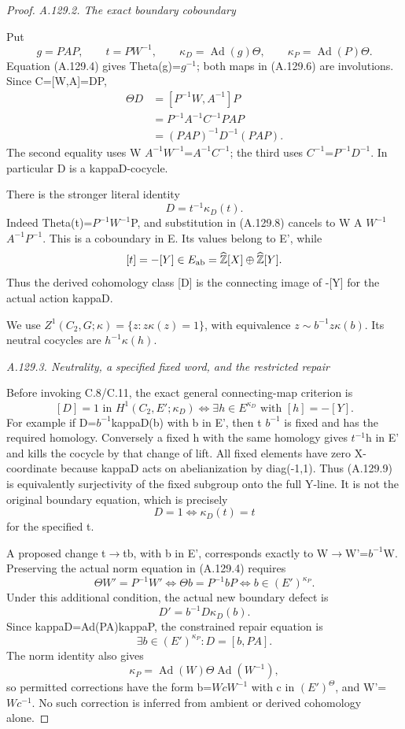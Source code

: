 \begin{proof}
\par\smallskip\noindent\emph{A.129.2. The exact boundary coboundary}

Put
\[
 g=PAP,\qquad t=PW^{-1},\qquad
 \kappa_D=\operatorname{Ad}(g)\Theta,
 \qquad\kappa_P=\operatorname{Ad}(P)\Theta.
\tag{A.129.6}
\]
Equation (A.129.4) gives Theta(g)=\(g^{-1}\); both maps in (A.129.6) are involutions. Since C=[W,A]=DP,
\[
\begin{aligned}
 \Theta D
 &=[P^{-1}W,A^{-1}]P\\
 &=P^{-1}A^{-1}C^{-1}PAP\\
 &=(PAP)^{-1}D^{-1}(PAP).
\end{aligned}
\tag{A.129.7}
\]
The second equality uses W \(A^{-1}\)\(W^{-1}\)=\(A^{-1}\)\(C^{-1}\); the third uses \(C^{-1}\)=\(P^{-1}\)\(D^{-1}\). In particular D is a kappaD-cocycle.

There is the stronger literal identity
\[
 \boxed{D=t^{-1}\kappa_D(t).}
\tag{A.129.8}
\]
Indeed Theta(t)=\(P^{-1}\)\(W^{-1}\)P, and substitution in (A.129.8) cancels to W A \(W^{-1}\) \(A^{-1}\)\(P^{-1}\). This is a coboundary in E. Its values belong to E', while
\[
 [t]=-[Y]\in E_{\rm ab}=\widehat{\mathbb Z}[X]\oplus\widehat{\mathbb Z}[Y].
\]
Thus the derived cohomology class [D] is the connecting image of -[Y] for the actual action kappaD.

We use \(Z^1(C_2,G;\kappa)=\{z:z\kappa(z)=1\}\), with equivalence \(z\sim b^{-1}z\kappa(b)\). Its neutral cocycles are \(h^{-1}\kappa(h)\).

\par\smallskip\noindent\emph{A.129.3. Neutrality, a specified fixed word, and the restricted repair}

Before invoking C.8/C.11, the exact general connecting-map criterion is
\[
 [D]=1\text{ in }H^1(C_2,E';\kappa_D)
 \iff\exists h\in E^{\kappa_D}\text{ with }[h]=-[Y].
\tag{A.129.9}
\]
For example if D=\(b^{-1}\)kappaD(b) with b in E', then t \(b^{-1}\) is fixed and has the required homology. Conversely a fixed h with the same homology gives \(t^{-1}\)h in E' and kills the cocycle by that change of lift. All fixed elements have zero X-coordinate because kappaD acts on abelianization by diag(-1,1). Thus (A.129.9) is equivalently surjectivity of the fixed subgroup onto the full Y-line. It is not the original boundary equation, which is precisely
\[
 D=1\iff\kappa_D(t)=t
\tag{A.129.10}
\]
for the specified t.

A proposed change t\(\to\)tb, with b in E', corresponds exactly to W\(\to\)W'=\(b^{-1}\)W. Preserving the actual norm equation in (A.129.4) requires
\[
 \Theta W'=P^{-1}W'
 \iff\Theta b=P^{-1}bP
 \iff b\in(E')^{\kappa_P}.
\tag{A.129.11}
\]
Under this additional condition, the actual new boundary defect is
\[
 D'=b^{-1}D\kappa_D(b).
\]
Since kappaD=Ad(PA)kappaP, the constrained repair equation is
\[
 \exists b\in(E')^{\kappa_P}:D=[b,PA].
\tag{A.129.12}
\]
The norm identity also gives
\[
 \kappa_P=\operatorname{Ad}(W)\Theta\operatorname{Ad}(W^{-1}),
\tag{A.129.13}
\]
so permitted corrections have the form b=\(WcW^{-1}\) with c in \((E')^\Theta\), and W'=\(Wc^{-1}\). No such correction is inferred from ambient or derived cohomology alone.


\end{proof}
